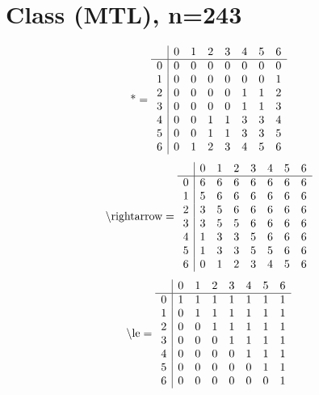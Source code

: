 \documentclass[11pt]{article}
\begin{document}
\section{Class (MTL), n=243}
\[\text{*} = 
\begin{array}{r | r r r r r r r}
 & 0 & 1 & 2 & 3 & 4 & 5 & 6 \\ \hline
0 & 0 & 0 & 0 & 0 & 0 & 0 & 0 \\
1 & 0 & 0 & 0 & 0 & 0 & 0 & 1 \\
2 & 0 & 0 & 0 & 0 & 1 & 1 & 2 \\
3 & 0 & 0 & 0 & 0 & 1 & 1 & 3 \\
4 & 0 & 0 & 1 & 1 & 3 & 3 & 4 \\
5 & 0 & 0 & 1 & 1 & 3 & 3 & 5 \\
6 & 0 & 1 & 2 & 3 & 4 & 5 & 6 \\
\end{array}
\]
\[\text{\textbackslash rightarrow} = 
\begin{array}{r | r r r r r r r}
 & 0 & 1 & 2 & 3 & 4 & 5 & 6 \\ \hline
0 & 6 & 6 & 6 & 6 & 6 & 6 & 6 \\
1 & 5 & 6 & 6 & 6 & 6 & 6 & 6 \\
2 & 3 & 5 & 6 & 6 & 6 & 6 & 6 \\
3 & 3 & 5 & 5 & 6 & 6 & 6 & 6 \\
4 & 1 & 3 & 3 & 5 & 6 & 6 & 6 \\
5 & 1 & 3 & 3 & 5 & 5 & 6 & 6 \\
6 & 0 & 1 & 2 & 3 & 4 & 5 & 6 \\
\end{array}
\]
\[\text{\textbackslash le} = 
\begin{array}{r | r r r r r r r}
 & 0 & 1 & 2 & 3 & 4 & 5 & 6 \\ \hline
0 & 1 & 1 & 1 & 1 & 1 & 1 & 1 \\
1 & 0 & 1 & 1 & 1 & 1 & 1 & 1 \\
2 & 0 & 0 & 1 & 1 & 1 & 1 & 1 \\
3 & 0 & 0 & 0 & 1 & 1 & 1 & 1 \\
4 & 0 & 0 & 0 & 0 & 1 & 1 & 1 \\
5 & 0 & 0 & 0 & 0 & 0 & 1 & 1 \\
6 & 0 & 0 & 0 & 0 & 0 & 0 & 1 \\
\end{array}
\]
\end{document}

